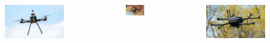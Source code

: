\documentclass[aspectratio=169,9pt]{beamer}
\begin{document}
\begin{frame}
\begin{columns}[c]
    \vspace{-1em}

    \begin{figure}
      \centering
      \includegraphics[width=1.0\textwidth]{./fig/uavs/t690_real.jpg}
    \end{figure}


    \begin{figure}
      \centering
      \includegraphics[width=1.0\textwidth]{./fig/uavs/naki_real.jpg}
    \end{figure}

    \vspace{-1em}

    \begin{figure}
      \centering
      \includegraphics[width=1.0\textwidth]{./fig/uavs/eagle_real.jpg}
    \end{figure}


\end{columns}
\end{frame}
\end{document}

